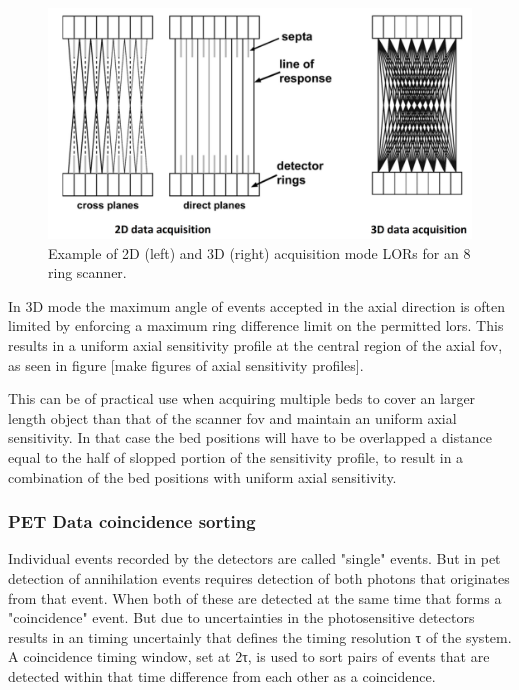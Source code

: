 \begin{figure} [h!]
\centering
\includegraphics[scale=0.30,angle=0]{2_Theory_Methods/figures/Phelps_2D_3D_Acquisition.png}
\caption{Example of 2D (left) and 3D (right) acquisition mode LORs for an 8 ring scanner.} 
\label{fig_2:2D3D}
\end{figure} 


In 3D mode the maximum angle of events accepted in the axial direction is often limited by enforcing a maximum ring difference limit on the permitted \glspl{lor}. This results in a uniform axial sensitivity profile at the central region of the axial \gls{fov}, as seen in figure [make figures of axial sensitivity profiles].

This can be of practical use when acquiring multiple beds to cover an larger length object than that of the scanner \gls{fov} and maintain an uniform axial sensitivity. In that case the bed positions will have to be overlapped a distance equal to the half of slopped portion of the sensitivity profile, to result in a combination of the bed positions with uniform axial sensitivity. 

\subsubsection{PET Data coincidence sorting}
Individual events recorded by the detectors are called "single" events. But in \gls{pet} detection of annihilation events requires detection of both photons that originates from that event. When both of these are detected at the same time that forms a "coincidence" event. But due to uncertainties in the photosensitive detectors results in an timing uncertainly that defines the timing resolution τ of the system. A coincidence timing window, set at 2τ, is used to sort pairs of events that are detected within that time difference from each other as a coincidence. \\

